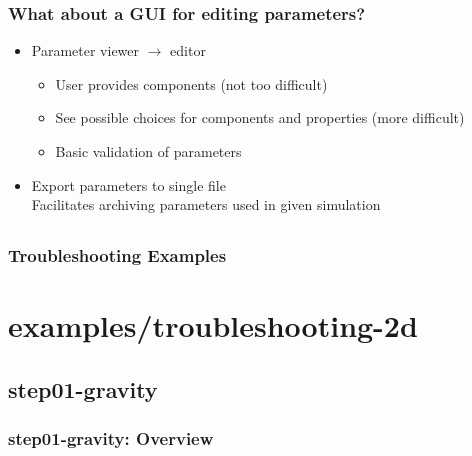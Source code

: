 \documentclass[aspectratio=169]{beamer}
\begin{document}
\begin{frame}
  \frametitle{What about a GUI for editing parameters?}

  \begin{itemize}
  \item Parameter viewer $\rightarrow$ editor
    \begin{itemize}
    \item User provides components (not too difficult)
    \item See possible choices for components and properties (more difficult)
    \item Basic validation of parameters
    \end{itemize}
  \item Export parameters to single file\\
    Facilitates archiving parameters used in given simulation
  \end{itemize}

\end{frame}


\subsection{}

\begin{frame}
  \frametitle{Troubleshooting Examples}

  
\end{frame}


\section{{\ttfamily examples/troubleshooting-2d}}
\subsection{{\ttfamily step01-gravity}}

\begin{frame}[fragile]
  \frametitle{{\ttfamily step01-gravity}: Overview}


  
\end{frame}
\end{document}
